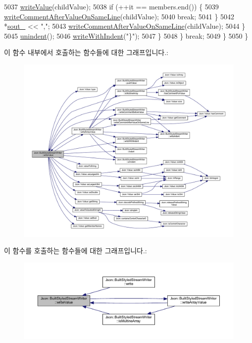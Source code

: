 \begin{DoxyCode}
5037         \hyperlink{struct_json_1_1_built_styled_stream_writer_a7c9da861861e570a51b45f270c9ff150}{writeValue}(childValue);
5038         \textcolor{keywordflow}{if} (++it == members.end()) \{
5039           \hyperlink{struct_json_1_1_built_styled_stream_writer_a89625b134fce0255263ca40e6125742b}{writeCommentAfterValueOnSameLine}(childValue);
5040           \textcolor{keywordflow}{break};
5041         \}
5042         *\hyperlink{class_json_1_1_stream_writer_a4f5603d4228a9fa46a42cb44e5234d9b}{sout\_} << \textcolor{stringliteral}{","};
5043         \hyperlink{struct_json_1_1_built_styled_stream_writer_a89625b134fce0255263ca40e6125742b}{writeCommentAfterValueOnSameLine}(childValue);
5044       \}
5045       \hyperlink{struct_json_1_1_built_styled_stream_writer_a0da6c6f603e00c8c6e38af553edd8c55}{unindent}();
5046       \hyperlink{struct_json_1_1_built_styled_stream_writer_a6e80e1a0d5f64df2ec48c3c3b1284990}{writeWithIndent}(\textcolor{stringliteral}{"\}"});
5047     \}
5048   \} \textcolor{keywordflow}{break};
5049   \}
5050 \}
\end{DoxyCode}
이 함수 내부에서 호출하는 함수들에 대한 그래프입니다.\+:
\nopagebreak
\begin{figure}[H]
\begin{center}
\leavevmode
\includegraphics[width=350pt]{struct_json_1_1_built_styled_stream_writer_a7c9da861861e570a51b45f270c9ff150_cgraph}
\end{center}
\end{figure}
이 함수를 호출하는 함수들에 대한 그래프입니다.\+:\nopagebreak
\begin{figure}[H]
\begin{center}
\leavevmode
\includegraphics[width=350pt]{struct_json_1_1_built_styled_stream_writer_a7c9da861861e570a51b45f270c9ff150_icgraph}
\end{center}
\end{figure}
